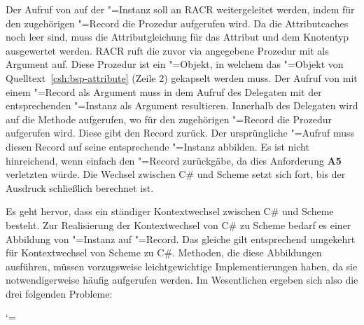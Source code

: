 Der Aufruf von  auf der "=Instanz  soll an RACR weitergeleitet werden, indem für den zugehörigen "=Record die Prozedur  aufgerufen wird. Da die Attributcaches noch leer sind, muss die Attributgleichung für das Attribut  und dem Knotentyp  ausgewertet werden. RACR ruft die zuvor via  angegebene Prozedur mit  als Argument auf. Diese Prozedur ist ein "=Objekt, in welchem das "=Objekt von Quelltext~\ref{csh:bsp-attribute} (Zeile 2) gekapselt werden muss. Der Aufruf von  mit einem "=Record als Argument muss in dem Aufruf des Delegaten mit der entsprechenden "=Instanz als Argument resultieren. Innerhalb des Delegaten wird auf  die Methode  aufgerufen, wo für den zugehörigen "=Record die Prozedur  aufgerufen wird. Diese gibt den Record  zurück. Der ursprüngliche "=Aufruf muss diesen Record auf seine entsprechende "=Instanz  abbilden. Es ist nicht hinreichend, wenn  einfach den "=Record zurückgäbe, da dies Anforderung \textbf{A5} verletzten würde. Die Wechsel zwischen C\# und Scheme setzt sich fort, bis der Ausdruck schließlich berechnet ist.

Es geht hervor, dass ein ständiger Kontextwechsel zwischen C\# und Scheme besteht. Zur Realisierung der Kontextwechsel von C\# zu Scheme bedarf es einer Abbildung von "=Instanz auf "=Record. Das gleiche gilt entsprechend umgekehrt für Kontextwechsel von Scheme zu C\#. Methoden, die diese Abbildungen ausführen, müssen vorzugsweise leichtgewichtige Implementierungen haben, da sie notwendigerweise häufig aufgerufen werden. Im Wesentlichen ergeben sich also die drei folgenden Probleme:

\makeatletter
\let\orig@item\item

\def\item{%
	\@ifnextchar{[}%
	{\lstinline@item}%
		{\orig@item}%
}

\begingroup
\catcode`\]=\active
\gdef\lstinline@item[{%
\setbox0\hbox\bgroup
\catcode`\]=\active
\let]\lstinline@item@end
}
\endgroup

\def\lstinline@item@end{%
	\egroup
	\orig@item[\usebox0]%
}

\makeatother

